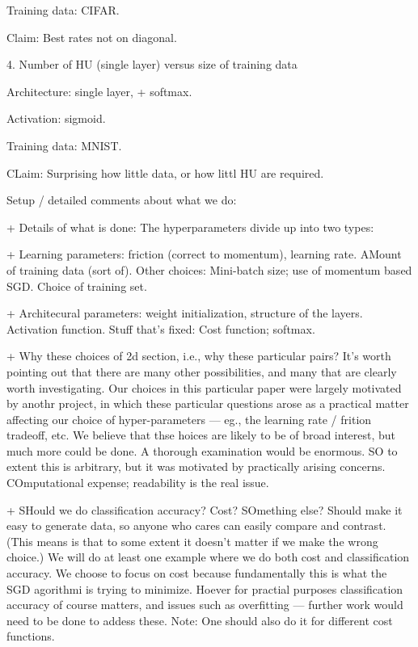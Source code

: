 \documentclass[10pt]{article}
\begin{document}
Training data: CIFAR.

Claim: Best rates not on diagonal.


4. Number of HU (single layer) versus size of training data

Architecture: single layer, + softmax.

Activation: sigmoid.

Training data: MNIST.


CLaim: Surprising how little data, or how littl HU are required.








Setup / detailed comments about what we do: 

+ Details of what is done: The hyperparameters divide up into two types:

+ Learning parameters: friction (correct to momentum), learning rate.
AMount of training data (sort of).  Other choices: Mini-batch size;
use of momentum based SGD.  Choice of training set.

+ Architecural parameters: weight initialization, structure of the
layers.  Activation function.  Stuff that's fixed: Cost function;
softmax.

+ Why these choices of 2d section, i.e., why these particular pairs?
It's worth pointing out that there are many other possibilities, and
many that are clearly worth investigating.  Our choices in this
particular paper were largely motivated by anothr project, in which
these particular questions arose as a practical matter affecting our
choice of hyper-parameters --- eg., the learning rate / frition
tradeoff, etc.  We believe that thse hoices are likely to be of broad
interest, but much more could be done.  A thorough examination would
be enormous.  SO to extent this is arbitrary, but it was motivated by
practically arising concerns.  COmputational expense; readability is
the real issue.


+ SHould we do classification accuracy?  Cost?  SOmething else?
Should make it easy to generate data, so anyone who cares can easily
compare and contrast.  (This means is that to some extent it doesn't
matter if we make the wrong choice.)  We will do at least one example
where we do both cost and classification accuracy.  We choose to focus
on cost because fundamentally this is what the SGD agorithmi is trying
to minimize.  Hoever for practial purposes classification accuracy of
course matters, and issues such as overfitting --- further work would
need to be done to addess these.  Note: One should also do it for
different cost functions.
\end{document}
